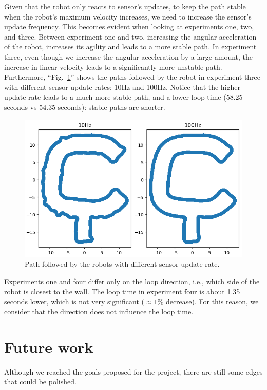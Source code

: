 \documentclass[conference]{IEEEtran}
\begin{document}
Given that the robot only reacts to sensor's updates, to keep the path stable when the robot's maximum velocity increases, we need to increase the sensor's update frequency. This becomes evident when looking at experiments one, two, and three. Between experiment one and two, increasing the angular acceleration of the robot, increases its agility and leads to a more stable path. In experiment three, even though we increase the angular acceleration by a large amount, the increase in linear velocity leads to a significantly more unstable path. Furthermore, ``Fig.~\ref{fig:update_rate}'' shows the paths followed by the robot in experiment three with different sensor update rates: 10Hz and 100Hz. Notice that the higher update rate leads to a much more stable path, and a lower loop time (58.25 seconds vs 54.35 seconds): stable paths are shorter.

\begin{figure}[htbp]
    \centerline{\includegraphics[width=0.8\linewidth]{images/update_rate.png}}
    \caption{Path followed by the robots with different sensor update rate.}
    \label{fig:update_rate}
\end{figure}

Experiments one and four differ only on the loop direction, i.e., which side of the robot is closest to the wall. The loop time in experiment four is about 1.35 seconds lower, which is not very significant ($\approx 1\%$ decrease). For this reason, we consider that the direction does not influence the loop time.

\section{Future work}

Although we reached the goals proposed for the project, there are still some edges that could be polished.
\end{document}
